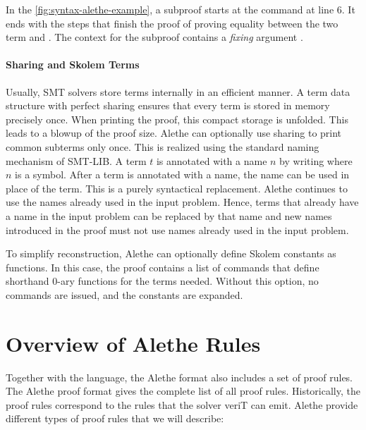 In the \cref{fig:syntax-alethe-example}, a subproof starts at the  command at line 6.
It ends with the  steps that finish the proof of proving equality between the two term  and .
The context for the subproof  contains a \emph{fixing} argument .

\paragraph{Sharing and Skolem Terms}

Usually, SMT solvers store terms internally in an efficient manner.
A term data structure with perfect sharing ensures that every term is stored in memory precisely once.
When printing the proof, this compact storage is unfolded. This leads to a blowup of the proof size.
Alethe can optionally use sharing to print common subterms only once.
This is realized using the standard naming mechanism of SMT-LIB. A term $t$
is annotated with a name $n$ by writing  where $n$ is a symbol.
After a term is annotated with a name, the name can be used in place of the term.
This is a purely syntactical replacement.
Alethe continues to use the names already used in the input problem.
Hence, terms that already have a name in the input problem can be replaced by that name and new
names introduced in the proof must not use names already used in the input problem.

To simplify reconstruction, Alethe can optionally define Skolem constants as functions. In this case, the proof contains a list of
 commands that define shorthand $0$-ary functions for the  terms
needed. Without this option, no  commands are issued, and the constants are expanded.

\section{Overview of Alethe Rules}

Together with the language, the Alethe format also includes a set of proof rules.
The Alethe proof format \cite[\S 5]{alethespec} gives the complete list of all proof rules.
Historically, the proof rules correspond to the rules that the solver veriT can emit.
Alethe provide different types of proof rules that we will describe:

